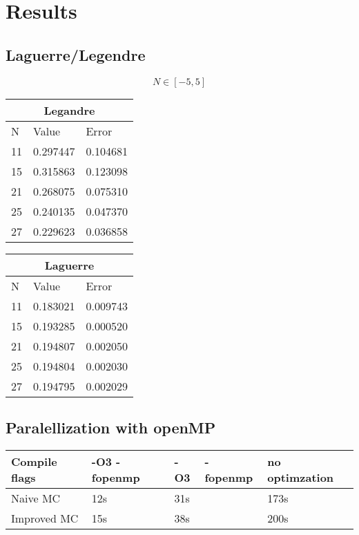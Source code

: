 \documentclass[../main.tex]{subfiles}
\begin{document}
\section{Results} \label{sec:results}
\subsection{Laguerre/Legendre} \label{sec:QMProb}


$$N \in [-5,5]$$

\begin{tabular}{ |p{1cm}|p{3cm}|p{3cm}|}
 \hline
 \multicolumn{3}{|c}{Legandre} \\
 \hline
       N   & Value & Error\\
 \hline
 11 & 0.297447 & 0.104681\\
 15 & 0.315863 & 0.123098\\
 21 & 0.268075 & 0.075310\\
 25 & 0.240135 & 0.047370\\
 27 & 0.229623 & 0.036858\\
 \hline
\end{tabular}


\begin{tabular}{ |p{1cm}|p{3cm}|p{3cm}|}
 \hline
 \multicolumn{3}{|c}{Laguerre} \\
 \hline
       N   & Value & Error\\
 \hline
 11 &  0.183021 &  0.009743\\
 15 &  0.193285 &  0.000520\\
 21 &  0.194807 &  0.002050\\
 25 &  0.194804 &  0.002030\\
 27 &  0.194795 &  0.002029\\

 \hline
\end{tabular}


\subsection{Paralellization with openMP} \label{sec:res-paralell}
\begin{table}[]
    \begin{tabular}{lllll}

        Compile flags & -O3 -fopenmp & -O3 & -fopenmp & no optimzation \\
        \hline
        Naive MC      & 12s          & 31s &          & 173s           \\
        Improved MC   & 15s          & 38s &          & 200s
    \end{tabular}
\end{table}
\end{document}
